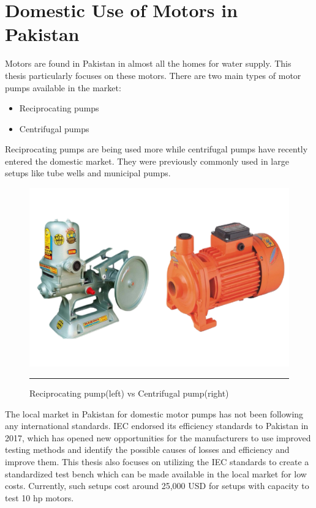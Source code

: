 \clearpage
\section{Domestic Use of Motors in Pakistan}
Motors are found in Pakistan in almost all the homes for water supply. This thesis particularly focuses on these motors. There are two main types of motor pumps available in the market:
\begin{itemize}
	\item Reciprocating pumps
	\item Centrifugal pumps
\end{itemize}
Reciprocating pumps are being used more while centrifugal pumps have recently entered the domestic market. They were previously commonly used in large setups like tube wells and municipal pumps.
\begin{figure}[htbp]
  \centering
    \includegraphics[width = 5in]{./Figures/MS/fig13.png}
    \rule{35em}{1.2pt}
  \caption{Reciprocating pump(left) vs Centrifugal pump(right)}
  \label{fig:Reciprocating pump(left) vs Centrifugal pump(right)}
\end{figure}
The local market in Pakistan for domestic motor pumps has not been following any international standards. IEC endorsed its efficiency standards to Pakistan in 2017, which has opened new opportunities for the manufacturers to use improved testing methods and identify the possible causes of losses and efficiency and improve them. This thesis also focuses on utilizing the IEC standards to create a standardized test bench which can be made available in the local market for low costs. Currently, such setups cost around 25,000 USD for setups with capacity to test 10 hp motors. 

